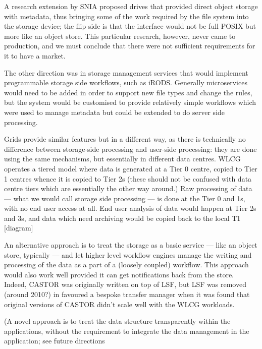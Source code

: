 
A research extension by SNIA proposed drives that provided direct object storage with metadata, thus bringing some of
the work required by the file system into the storage device; the flip side is that the interface would not be full POSIX
but more like an object store.  This particular research, however, never came to production, and we must conclude that
there were not sufficient requirements for it to have a market.

The other direction was in storage management services that would implement programmable storage side workflows, such as
iRODS.  Generally microservices would need to be added in order to support new file types and change the rules, but the
system would be customised to provide relatively simple workflows which were used to manage metadata but could be
extended to do server side processing.

Grids provide similar features but in a different way, as there is technically no difference between storage-side
processing and user-side processing: they are done using the same mechanisms, but essentially in different data
centres. WLCG operates a tiered model where data is generated at a Tier 0 centre, copied to Tier 1 centres whence it is
copied to Tier 2s (these should not be confused with data centre tiers which are essentially the other way around.)  Raw
processing of data ---  what we would call storage side processing --- is done at the Tier 0 and 1s, with no end user access
at all. End user analysis of data would happen at Tier 2s and 3s, and data which need archiving would be copied back to
the local T1 [diagram]

An alternative approach is to treat the storage as a basic service --- like an
object store, typically --- and let higher level workflow engines manage the
writing and processing of the data as a part of a (loosely coupled) workflow.
This approach would also work well provided it can get notifications back from
the store.  Indeed, CASTOR was originally written on top of LSF, but LSF was
removed (around 2010?) in favoured a bespoke transfer manager when it was found
that original versions of CASTOR didn't scale well with the WLCG
workloads.

(A novel approach is to treat the data structure transparently within the applications, without the requirement to
integrate the data management in the application; see future directions


